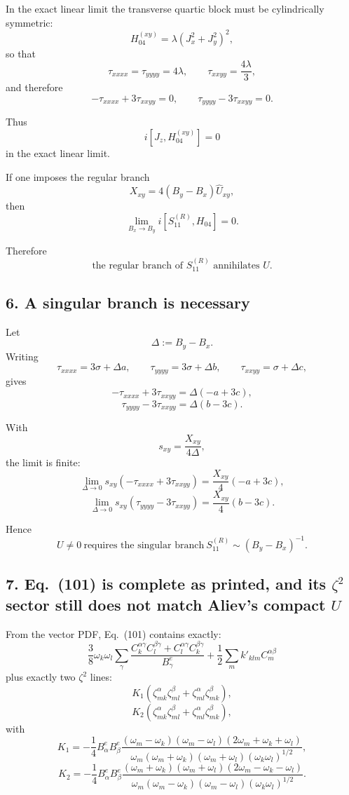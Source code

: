 \documentclass[11pt]{article}
\begin{document}
In the exact linear limit the transverse quartic block must be cylindrically symmetric:
\[
H_{04}^{(xy)}=\lambda(J_x^2+J_y^2)^2,
\]
so that
\[
\tau_{xxxx}=\tau_{yyyy}=4\lambda,\qquad \tau_{xxyy}=\frac{4\lambda}{3},
\]
and therefore
\[
-\tau_{xxxx}+3\tau_{xxyy}=0,\qquad \tau_{yyyy}-3\tau_{xxyy}=0.
\]

Thus
\[
i[J_z,H_{04}^{(xy)}]=0
\]
in the exact linear limit.

If one imposes the regular branch
\[
X_{xy}=4(B_y-B_x)\widehat U_{xy},
\]
then
\[
\lim_{B_x\to B_y} i[S_{11}^{(R)},H_{04}] = 0.
\]

Therefore
\[
\boxed{\text{the regular branch of }S_{11}^{(R)}\text{ annihilates }U.}
\]

\subsection*{6. A singular branch is necessary}

Let
\[
\Delta:=B_y-B_x.
\]
Writing
\[
\tau_{xxxx}=3\sigma+\Delta a,\qquad
\tau_{yyyy}=3\sigma+\Delta b,\qquad
\tau_{xxyy}=\sigma+\Delta c,
\]
gives
\[
-\tau_{xxxx}+3\tau_{xxyy}=\Delta(-a+3c),
\]
\[
\tau_{yyyy}-3\tau_{xxyy}=\Delta(b-3c).
\]

With
\[
s_{xy}=\frac{X_{xy}}{4\Delta},
\]
the limit is finite:
\[
\lim_{\Delta\to 0}s_{xy}(-\tau_{xxxx}+3\tau_{xxyy})
=\frac{X_{xy}}{4}(-a+3c),
\]
\[
\lim_{\Delta\to 0}s_{xy}(\tau_{yyyy}-3\tau_{xxyy})
=\frac{X_{xy}}{4}(b-3c).
\]

Hence
\[
\boxed{U\neq 0\ \text{requires the singular branch}\ S_{11}^{(R)}\sim (B_y-B_x)^{-1}.}
\]

\subsection*{7. Eq.~(101) is complete as printed, and its \(\zeta^2\) sector still does not match Aliev's compact \(U\)}

From the vector PDF, Eq.~(101) contains exactly:
\[
\frac{3}{8}\omega_k\omega_l \sum_\gamma
\frac{C_k^{\alpha\gamma}C_l^{\beta\gamma}+C_l^{\alpha\gamma}C_k^{\beta\gamma}}{B_\gamma^e}
+\frac12\sum_m k'_{klm}C_m^{\alpha\beta}
\]
plus exactly two \(\zeta^2\) lines:
\[
K_1(\zeta_{mk}^{\alpha}\zeta_{ml}^{\beta}+\zeta_{ml}^{\alpha}\zeta_{mk}^{\beta}),
\]
\[
K_2(\zeta_{mk}^{\alpha}\zeta_{ml}^{\beta}+\zeta_{ml}^{\alpha}\zeta_{mk}^{\beta}),
\]
with
\[
K_1=
-\frac14 B_\alpha^e B_\beta^e
\frac{(\omega_m-\omega_k)(\omega_m-\omega_l)(2\omega_m+\omega_k+\omega_l)}
{\omega_m(\omega_m+\omega_k)(\omega_m+\omega_l)(\omega_k\omega_l)^{1/2}},
\]
\[
K_2=
-\frac14 B_\alpha^e B_\beta^e
\frac{(\omega_m+\omega_k)(\omega_m+\omega_l)(2\omega_m-\omega_k-\omega_l)}
{\omega_m(\omega_m-\omega_k)(\omega_m-\omega_l)(\omega_k\omega_l)^{1/2}}.
\]
\end{document}
